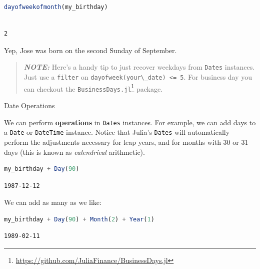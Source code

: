 \documentclass[
  notoc %
]{tufte-book}
\makeatletter
\DeclareRobustCommand{\href}[2]{#2\footnote{\url{#1}}}
\newcommand{\passthrough}[1]{#1}
\renewcommand\subsubsection{%
\@startsection{subsubsection}{3}{\z@ }{-3.25ex\@plus -1ex \@minus -.2ex}{1.5ex \@plus .2ex}{\normalfont \normalsize \bfseries }
}
\makeatother
\begin{document}
\begin{lstlisting}[language=Julia]
dayofweekofmonth(my_birthday)
\end{lstlisting}

\begin{lstlisting}[language=Output]

2

\end{lstlisting}

Yep, Jose was born on the second Sunday of September.

\begin{quote}
\textbf{\emph{NOTE:}} Here's a handy tip to just recover weekdays from
\passthrough{\lstinline!Dates!} instances. Just use a
\passthrough{\lstinline!filter!} on
\passthrough{\lstinline!dayofweek(your\_date) <= 5!}. For business day
you can checkout the
\href{https://github.com/JuliaFinance/BusinessDays.jl}{\passthrough{\lstinline!BusinessDays.jl!}}
package.
\end{quote}

\hypertarget{sec:dates_operations}{%
\subsubsection{Date Operations}\label{sec:dates_operations}}

We can perform \textbf{operations} in \passthrough{\lstinline!Dates!}
instances. For example, we can add days to a
\passthrough{\lstinline!Date!} or \passthrough{\lstinline!DateTime!}
instance. Notice that Julia's \passthrough{\lstinline!Dates!} will
automatically perform the adjustments necessary for leap years, and for
months with 30 or 31 days (this is known as \emph{calendrical}
arithmetic).

\begin{lstlisting}[language=Julia]
my_birthday + Day(90)
\end{lstlisting}

\begin{lstlisting}[language=Output]
1987-12-12
\end{lstlisting}

We can add as many as we like:

\begin{lstlisting}[language=Julia]
my_birthday + Day(90) + Month(2) + Year(1)
\end{lstlisting}

\begin{lstlisting}[language=Output]
1989-02-11
\end{lstlisting}
\end{document}
